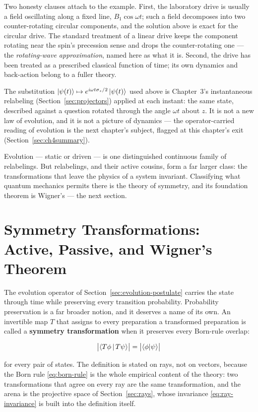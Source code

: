 Two honesty clauses attach to the example. First, the laboratory drive is usually a field oscillating along a fixed line, $B_1\cos\omega t$; such a field decomposes into two counter-rotating circular components, and the solution above is exact for the circular drive. The standard treatment of a linear drive keeps the component rotating near the spin's precession sense and drops the counter-rotating one --- the \emph{rotating-wave approximation}, named here as what it is. Second, the drive has been treated as a prescribed classical function of time; its own dynamics and back-action belong to a fuller theory.

\begin{note}
The substitution $\ket{\psi(t)} \mapsto e^{i\omega t\sigma_z/2}\ket{\psi(t)}$ used above is Chapter~3's instantaneous relabeling (Section~\ref{sec:projectors}) applied at each instant: the same state, described against a question rotated through the angle $\omega t$ about $z$. It is not a new law of evolution, and it is not a picture of dynamics --- the operator-carried reading of evolution is the next chapter's subject, flagged at this chapter's exit (Section~\ref{sec:ch4summary}).
\end{note}

Evolution --- static or driven --- is one distinguished continuous family of relabelings. But relabelings, and their active cousins, form a far larger class: the transformations that leave the physics of a system invariant. Classifying what quantum mechanics permits there is the theory of symmetry, and its foundation theorem is Wigner's --- the next section.

\section{Symmetry Transformations: Active, Passive, and Wigner's Theorem}
\label{sec:symmetry-transformations}

The evolution operator of Section~\ref{sec:evolution-postulate} carries the state through time while preserving every transition probability. Probability preservation is a far broader notion, and it deserves a name of its own. An invertible map $T$ that assigns to every preparation a transformed preparation is called a \textbf{symmetry transformation} when it preserves every Born-rule overlap:
\begin{linenomath}
    \begin{equation}
        \bigl|\braket{T\phi\,|\,T\psi}\bigr| = \bigl|\braket{\phi|\psi}\bigr|
        \label{eq:symmetry-def}
    \end{equation}
\end{linenomath}
for every pair of states. The definition is stated on rays, not on vectors, because the Born rule \eqref{eq:born-rule} is the whole empirical content of the theory: two transformations that agree on every ray are the same transformation, and the arena is the projective space of Section~\ref{sec:rays}, whose invariance \eqref{eq:ray-invariance} is built into the definition itself.

